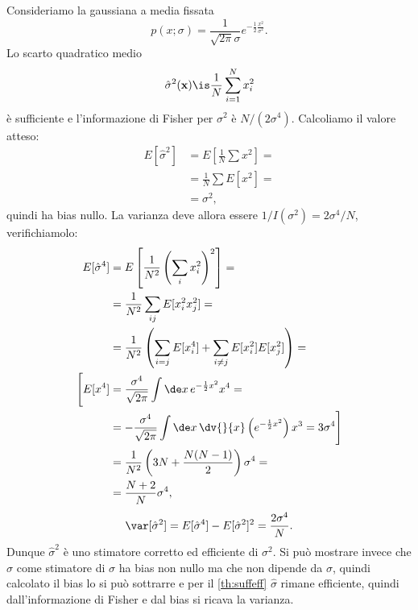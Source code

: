 \begin{example}
	Consideriamo la gaussiana a media fissata
	\begin{equation*}
		p(x;\sigma)
		= \frac1{\sqrt{2\pi}\sigma} e^{-\frac12 \frac{x^2}{\sigma^2}}.
	\end{equation*}
	Lo scarto quadratico medio
	\begin{equation*}
		\hat\sigma^2(\mathbf x)
		\is \frac1N \sum_{i=1}^N x_i^2
	\end{equation*}
	è sufficiente e l'informazione di Fisher per $\sigma^2$ è $N/(2\sigma^4)$.
	Calcoliamo il valore atteso:
	\begin{align*}
		E[\hat\sigma^2]
		&= E \left[ \frac 1N \sum x^2 \right] = \\
		&= \frac 1N \sum E[x^2] = \\
		&= \sigma^2,
	\end{align*}
	quindi ha bias nullo.
	La varianza deve allora essere $1/I(\sigma^2)=2\sigma^4/N$, verifichiamolo:
	\begin{align*}
		E[\hat\sigma^4]
		&= E \left[ \frac1{N^2}\left(\sum_ix_i^2\right)^2 \right] = \\
		&= \frac1{N^2} \sum_{ij} E[x_i^2x_j^2] = \\
		&= \frac1{N^2} \left( \sum_{i=j} E[x_i^4] + \sum_{i\neq j} E[x_i^2]E[x_j^2] \right) = \\
		\Bigg[ E[x^4]
		&= \frac{\sigma^4}{\sqrt{2\pi}} \int\de x\, e^{-\frac12 x^2} x^4 = \\
		&= - \frac{\sigma^4}{\sqrt{2\pi}} \int\de x\, \dv{}{x} \left(e^{-\frac12x^2}\right) x^3
		= 3 \sigma^4 \Bigg] \\
		&= \frac1{N^2} \left( 3N + \frac{N(N-1)}2 \right) \sigma^4 = \\
		&= \frac{N+2}N \sigma^4,
	\end{align*}
	\begin{equation*}
		\var[\hat\sigma^2]
		= E[\hat\sigma^4] - E[\hat\sigma^2]^2
		= \frac{2\sigma^4}N.
	\end{equation*}
	Dunque $\hat\sigma^2$ è uno stimatore corretto ed efficiente di $\sigma^2$.
	Si può mostrare invece che $\hat\sigma$ come stimatore di $\sigma$ ha bias non nullo
	ma che non dipende da $\sigma$,
	quindi calcolato il bias lo si può sottrarre e per il \autoref{th:suffeff} $\hat\sigma$ rimane efficiente,
	quindi dall'informazione di Fisher e dal bias si ricava la varianza.
\end{example}
